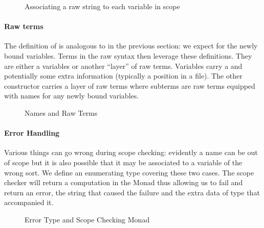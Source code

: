 \begin{figure}[h]
\begin{minipage}[t]{0.6\textwidth}
\end{minipage}
\begin{minipage}[t]{0.3\textwidth}
\end{minipage}
\caption{Associating a raw string to each variable in scope}
\end{figure}

\paragraph{Raw terms}
The definition of  is analogous to  in the
previous section: we expect  for the newly bound
variables. Terms in the raw syntax then leverage these
definitions. They are either a variables or another ``layer'' of raw
terms. Variables  carry a  and potentially some
extra information  (typically a position in a file). The other
constructor  carries a layer of raw terms where subterms are
raw terms equipped with names for any newly bound variables.

\begin{figure}[h]
\caption{Names and Raw Terms}
\end{figure}

\paragraph{Error Handling} Various things can go wrong during scope checking:
evidently a name can be out of scope but it is also possible that it may be
associated to a variable of the wrong sort. We define an enumerating type
covering these two cases. The scope checker will return a computation in the
Monad  thus allowing us to fail and return an error, the string that
caused the failure and the extra data of type  that accompanied it.

\begin{figure}[h]
\begin{minipage}[t]{0.5\textwidth}
\end{minipage}
\begin{minipage}[t]{0.4\textwidth}
\end{minipage}
\caption{Error Type and Scope Checking Monad}\label{fig:scopemonad}
\end{figure}

